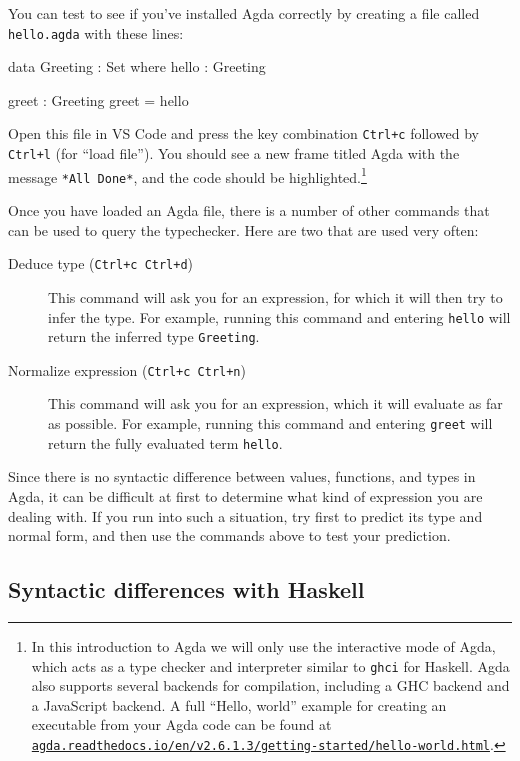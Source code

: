 \documentclass[a4paper,UKenglish]{tufte-handout}
\newcommand{\hrefu}[2]{\href{#1}{\nolinkurl{#2}}}
\theoremstyle{definition}
\begin{document}
You can test to see if you’ve installed Agda correctly by creating a file
called \texttt{hello.agda} with these lines:

\begin{code}[number]
data Greeting : Set where
  hello : Greeting

greet : Greeting
greet = hello
\end{code}
Open this file in VS Code and press the key combination
\texttt{Ctrl+c} followed by \texttt{Ctrl+l} (for ``load file''). You
should see a new frame titled Agda with the message \texttt{*All
Done*}, and the code should be highlighted.\footnote{In this
introduction to Agda we will only use the interactive mode of Agda,
which acts as a type checker and interpreter similar to \texttt{ghci}
for Haskell. Agda also supports several backends for compilation,
including a GHC backend and a JavaScript backend. A full ``Hello,
world'' example for creating an executable from your Agda code can be
found at
\hrefu{https://agda.readthedocs.io/en/v2.6.1.3/getting-started/hello-world.html}{agda.readthedocs.io/en/v2.6.1.3/getting-started/hello-world.html}.}

Once you have loaded an Agda file, there is a number of other commands that
can be used to query the typechecker. Here are two that are used very often:

\begin{description}
\item[Deduce type (\texttt{Ctrl+c Ctrl+d})] This command will ask you
  for an expression, for which it will then try to infer the type. For
  example, running this command and entering \texttt{hello} will
  return the inferred type \texttt{Greeting}.
\item[Normalize expression (\texttt{Ctrl+c Ctrl+n})] This command will ask you
  for an expression, which it will evaluate as far as possible. For
  example, running this command and entering \texttt{greet} will
  return the fully evaluated term \texttt{hello}.
\end{description}

Since there is no syntactic difference between values, functions, and types in
Agda, it can be difficult at first to determine what kind of expression you are
dealing with. If you run into such a situation, try first to predict its type
and normal form, and then use the commands above to test your prediction.

\subsection{Syntactic differences with Haskell}
\end{document}
